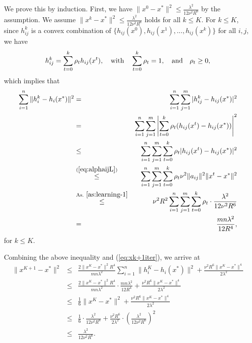 \documentclass[12pt]{article}
\newcommand{\newalpha}{h}
\begin{document}
We prove this by induction. First, we have $\|x^0 - x^*\|^2 \leq \frac{\lambda^2}{12\nu^2R^6}$ by the assumption. We assume $\|x^k - x^*\|^2 \leq \frac{\lambda^2}{12\nu^2R^6}$ holds for all $k \leq K$. For $k\leq K$, since $h_{ij}^k$ is a convex combination of $\{  \newalpha_{ij}(x^0), \newalpha_{ij}(x^1), ..., \newalpha_{ij}(x^k)  \}$ for all $i,j$, we have 
$$
h_{ij}^k = \sum_{t=0}^k \rho_t \newalpha_{ij}(x^t), \quad {\rm with}\quad  \sum_{t=0}^k\rho_t = 1, \quad {\rm and} \quad \rho_t \geq 0, 
$$
which implies that 
\begin{eqnarray*}
	\sum_{i=1}^n\|h_i^k - \newalpha_i(x^*)\|^2 &=& \sum_{i=1}^n \sum_{j=1}^m |h_{ij}^k - \newalpha_{ij}(x^*)|^2 \\
	&=&  \sum_{i=1}^n \sum_{j=1}^m \left|  \sum_{t=0}^k \rho_t (\newalpha_{ij}(x^t) - \newalpha_{ij}(x^*))  \right|^2 \\ 
	&\leq&  \sum_{i=1}^n \sum_{j=1}^m  \sum_{t=0}^k \rho_t | \newalpha_{ij}(x^t) - \newalpha_{ij}(x^*) |^2 \\ 
	&\overset{(\ref{eq:alphaijL})}{\leq}&  \sum_{i=1}^n \sum_{j=1}^m  \sum_{t=0}^k \rho_t \nu^2 \|a_{ij}\|^2 \|x^t - x^*\|^2 \\ 
	&\overset{\text{As.}~\ref{as:learning-1}}{\leq}& \nu^2 R^2 \sum_{i=1}^n \sum_{j=1}^m  \sum_{t=0}^k \rho_t \cdot \frac{\lambda^2}{12\nu^2R^6} \\
	&=& \frac{mn \lambda^2}{12R^4}, 
\end{eqnarray*}
for $k\leq K$. 

\noindent Combining the above inequality and (\ref{eq:xk+1iter}), we arrive at 
\begin{eqnarray*}
	\|x^{K+1} - x^*\|^2 &\leq& \frac{2\|x^K-x^*\|^2 R^4}{mn\lambda^2} \sum_{i=1}^n \|h_i^K - \newalpha_i(x^*)\|^2 + \frac{ \nu^2 R^6\|x^K-x^*\|^4}{2\lambda^2} \\
	&\leq&  \frac{2\|x^K-x^*\|^2 R^4}{mn\lambda^2} \cdot  \frac{mn \lambda^2}{12R^4} +  \frac{ \nu^2 R^6\|x^K-x^*\|^4}{2\lambda^2} \\
	&\leq& \frac{1}{6}\|x^K - x^*\|^2 +  \frac{ \nu^2 R^6\|x^K-x^*\|^4}{2\lambda^2} \\
	&\leq& \frac{1}{6} \cdot \frac{\lambda^2}{12\nu^2R^6} + \frac{ \nu^2 R^6}{2\lambda^2} \cdot \left(\frac{\lambda^2}{12\nu^2R^6} \right)^2 \\ 
	&\leq& \frac{\lambda^2}{12\nu^2R^6}. 
\end{eqnarray*}







\clearpage






\end{document}

